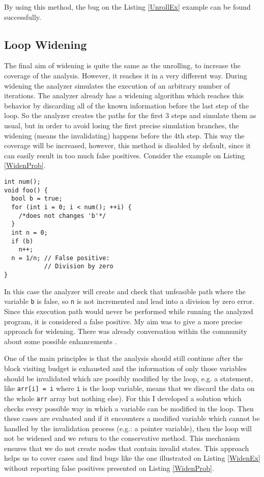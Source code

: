 \documentclass[oneside, a4paper, 12pt]{article}
\theoremstyle{definition}
\begin{document}
By using this method, the bug on the Listing \ref{UnrollEx} example can be 
found successfully.

\subsection{Loop Widening}
The final aim of widening is quite the same as the unrolling, to increase 
the coverage of the analysis. However, it reaches it in a very different way. 
During widening the analyzer simulates the execution of an arbitrary number 
of iterations. The analyzer already has a widening algorithm which reaches 
this behavior by discarding all of the known information before the last step 
of the loop. So the analyzer creates the paths for the first 3 steps and 
simulate them as usual, but in order to avoid losing the first precise simulation branches, the widening (means the invalidating) happens 
before the 4th step. 
This way the coverage will be increased, however, this method is disabled by 
default, since it can easily result in too much false positives. Consider the 
example on Listing \ref{WidenProb}.
\\

\begin{lstlisting}
int num();
void foo() {
  bool b = true;
  for (int i = 0; i < num(); ++i) {
    /*does not changes 'b'*/
  }
  int n = 0;
  if (b)
    n++;
  n = 1/n; // False positive:
           // Division by zero
}\end{lstlisting}
In this case the analyzer will create and check that unfeasible path where 
the variable \texttt{b} is false, so \texttt{n} is not incremented and lead 
into a division by zero error. Since this execution path would never be 
performed while running the analyzed program, it is considered a false positive. My aim 
was to give a more precise approach for widening. There was already conversation within the community about some possible enhancements \cite{Widening}.

One of the main principles is that the analysis should still continue after the block 
visiting budget is exhausted and the information of only those variables should be invalidated which are possibly modified by the loop, e.g. a statement, like \texttt{arr[i] = i} where \texttt{i} is the loop variable, means that we discard the data on the whole \texttt{arr} array but nothing else).
For this I developed a solution which checks every possible way in which a 
variable can be modified in the loop. Then these cases are evaluated and if it 
encounters a modified variable which cannot be handled by the invalidation 
process (e.g.: a pointer variable), then the loop will not be widened and we
return to the conservative method. This mechanism ensures that we do not create 
nodes that contain invalid states.
This approach helps us to cover cases and find bugs like the one illustrated on 
Listing \ref{WidenEx} without reporting false positives  
presented on Listing \ref{WidenProb}.
\end{document}
